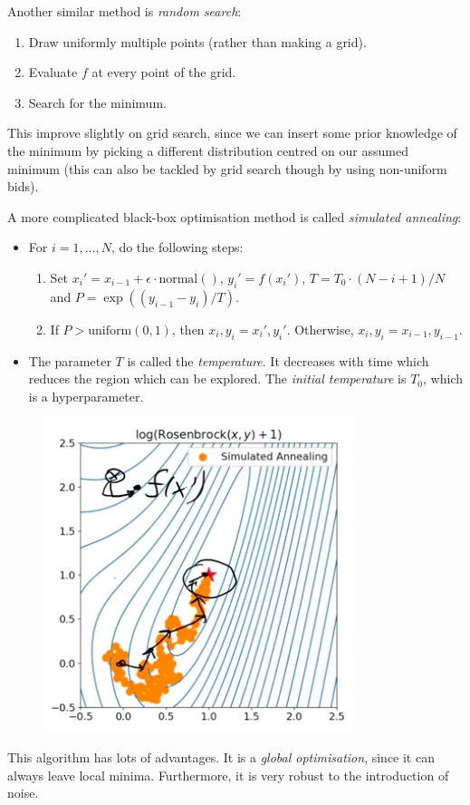 \minirule

Another similar method is \textit{random search}:
\begin{enumerate}
\item Draw uniformly multiple points (rather than making a grid).
\item Evaluate $f$ at every point of the grid.
\item Search for the minimum.
\end{enumerate}
This improve slightly on grid search, since we can insert some prior knowledge of the minimum by picking a different distribution centred on our assumed minimum (this can also be tackled by grid search though by using non-uniform bids).

\minirule

A more complicated black-box optimisation method is called \textit{simulated annealing}:
\begin{itemize}
\item For $i=1,...,N$, do the following steps:
\begin{enumerate}
\item Set $x_i' = x_{i-1} + \epsilon \cdot \textrm{normal}()$, $y_i' = f(x_i')$, $T = T_0 \cdot (N- i + 1)/N$ and $P = \exp((y_{i-1} - y_i)/T)$.
\item If $P > \textrm{uniform}(0,1)$, then $x_i, y_i = x_i', y_i'$. Otherwise, $x_i, y_i = x_{i-1}, y_{i-1}$.
\end{enumerate}
\item The parameter $T$ is called the \textit{temperature}. It decreases with time which reduces the region which can be explored. The \textit{initial temperature} is $T_0$, which is a hyperparameter.
\end{itemize}
\begin{figure}[H]
\centering
\includegraphics[scale=0.4]{simulatedannealing.png}
\end{figure}
This algorithm has lots of advantages. It is a \textit{global optimisation}, since it can always leave local minima. Furthermore, it is very robust to the introduction of noise. 






